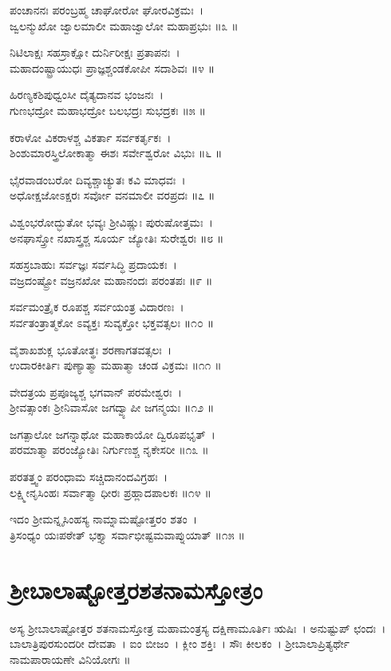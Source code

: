 ಪಂಚಾನನಃ ಪರಂಬ್ರಹ್ಮ ಚಾಘೋರೋ ಘೋರವಿಕ್ರಮಃ~।\\
ಜ್ವಲನ್ಮುಖೋ ಜ್ವಾಲಮಾಲೀ ಮಹಾಜ್ವಾಲೋ ಮಹಾಪ್ರಭುಃ ॥೩ ॥

ನಿಟಿಲಾಕ್ಷಃ ಸಹಸ್ರಾಕ್ಷೋ ದುರ್ನಿರೀಕ್ಷಃ ಪ್ರತಾಪನಃ~।\\
ಮಹಾದಂಷ್ಟ್ರಾಯುಧಃ ಪ್ರಾಜ್ಞಶ್ಚಂಡಕೋಪೀ ಸದಾಶಿವಃ ॥೪ ॥

ಹಿರಣ್ಯಕಶಿಪುಧ್ವಂಸೀ ದೈತ್ಯದಾನವ ಭಂಜನಃ~।\\
ಗುಣಭದ್ರೋ ಮಹಾಭದ್ರೋ ಬಲಭದ್ರಃ ಸುಭದ್ರಕಃ ॥೫ ॥

ಕರಾಳೋ ವಿಕರಾಳಶ್ಚ ವಿಕರ್ತಾ ಸರ್ವಕರ್ತೃಕಃ~।\\
ಶಿಂಶುಮಾರಸ್ತ್ರಿಲೋಕಾತ್ಮಾ ಈಶಃ ಸರ್ವೇಶ್ವರೋ ವಿಭುಃ ॥೬ ॥

ಭೈರವಾಡಂಬರೋ ದಿವ್ಯಶ್ಚಾಚ್ಯುತಃ ಕವಿ ಮಾಧವಃ~।\\
ಅಧೋಕ್ಷಜೋಽಕ್ಷರಃ ಸರ್ವೋ ವನಮಾಲೀ ವರಪ್ರದಃ ॥೭ ॥

ವಿಶ್ವಂಭರೋದ್ಭುತೋ ಭವ್ಯಃ ಶ್ರೀವಿಷ್ಣುಃ ಪುರುಷೋತ್ತಮಃ~।\\
ಅನಘಾಸ್ತ್ರೋ ನಖಾಸ್ತ್ರಶ್ಚ ಸೂರ್ಯ ಜ್ಯೋತಿಃ ಸುರೇಶ್ವರಃ ॥೮ ॥

ಸಹಸ್ರಬಾಹುಃ ಸರ್ವಜ್ಞಃ ಸರ್ವಸಿದ್ಧಿ ಪ್ರದಾಯಕಃ~।\\
ವಜ್ರದಂಷ್ಟ್ರೋ ವಜ್ರನಖೋ ಮಹಾನಂದಃ ಪರಂತಪಃ ॥೯ ॥

ಸರ್ವಮಂತ್ರೈಕ ರೂಪಶ್ಚ ಸರ್ವಯಂತ್ರ ವಿದಾರಣಃ~।\\
ಸರ್ವತಂತ್ರಾತ್ಮಕೋ ಽವ್ಯಕ್ತಃ ಸುವ್ಯಕ್ತೋ ಭಕ್ತವತ್ಸಲಃ ॥೧೦ ॥

ವೈಶಾಖಶುಕ್ಲ ಭೂತೋತ್ಥಃ ಶರಣಾಗತವತ್ಸಲಃ~।\\
ಉದಾರಕೀರ್ತಿಃ ಪುಣ್ಯಾತ್ಮಾ ಮಹಾತ್ಮಾ ಚಂಡ ವಿಕ್ರಮಃ ॥೧೧ ॥

ವೇದತ್ರಯ ಪ್ರಪೂಜ್ಯಶ್ಚ ಭಗವಾನ್ ಪರಮೇಶ್ವರಃ~।\\
ಶ್ರೀವತ್ಸಾಂಕಃ ಶ್ರೀನಿವಾಸೋ ಜಗದ್ವ್ಯಾಪೀ ಜಗನ್ಮಯಃ ॥೧೨ ॥

ಜಗತ್ಪಾಲೋ ಜಗನ್ನಾಥೋ ಮಹಾಕಾಯೋ ದ್ವಿರೂಪಭೃತ್~।\\
ಪರಮಾತ್ಮಾ ಪರಂಜ್ಯೋತಿಃ ನಿರ್ಗುಣಶ್ಚ ನೃಕೇಸರೀ ॥೧೩ ॥

ಪರತತ್ತ್ವಂ ಪರಂಧಾಮ ಸಚ್ಚಿದಾನಂದವಿಗ್ರಹಃ~।\\
ಲಕ್ಷ್ಮೀನೃಸಿಂಹಃ ಸರ್ವಾತ್ಮಾ ಧೀರಃ ಪ್ರಹ್ಲಾದಪಾಲಕಃ ॥೧೪ ॥

ಇದಂ ಶ್ರೀಮನ್ನೃಸಿಂಹಸ್ಯ ನಾಮ್ನಾಮಷ್ಟೋತ್ತರಂ ಶತಂ~।\\
ತ್ರಿಸಂಧ್ಯಂ ಯಃಪಠೇತ್ ಭಕ್ತ್ಯಾ ಸರ್ವಾಭೀಷ್ಟಮವಾಪ್ನುಯಾತ್ ॥೧೫ ॥
\section{ಶ್ರೀಬಾಲಾಷ್ಟೋತ್ತರಶತನಾಮಸ್ತೋತ್ರಂ}
ಅಸ್ಯ ಶ್ರೀಬಾಲಾಷ್ಟೋತ್ತರ ಶತನಾಮಸ್ತೋತ್ರ ಮಹಾಮಂತ್ರಸ್ಯ  ದಕ್ಷಿಣಾಮೂರ್ತಿಃ ಋಷಿಃ~। ಅನುಷ್ಟುಪ್ ಛಂದಃ~। ಬಾಲಾತ್ರಿಪುರಸುಂದರೀ ದೇವತಾ~। ಐಂ ಬೀಜಂ~। ಕ್ಲೀಂ ಶಕ್ತಿಃ~। ಸೌಃ ಕೀಲಕಂ~।  ಶ್ರೀಬಾಲಾಪ್ರಿತ್ಯರ್ಥೇ ನಾಮಪಾರಾಯಣೇ ವಿನಿಯೋಗಃ ॥

